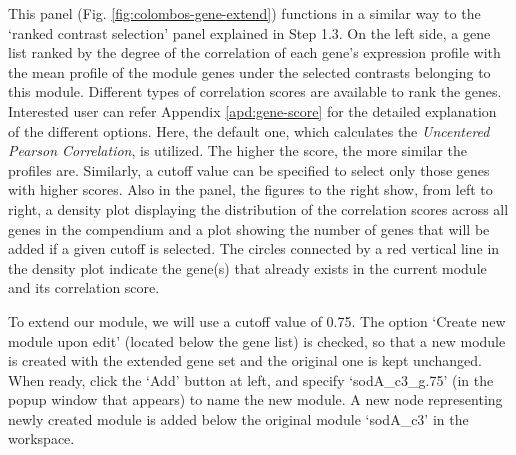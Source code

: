 \begin{small}
This panel (Fig. \ref{fig:colombos-gene-extend}) functions in a similar way to 
the `ranked contrast selection' panel explained in Step 1.3. 
%
On the left side, a gene list ranked by the degree of the correlation of each
gene's expression profile with the mean profile of the module genes under the
selected contrasts belonging to this module.  
%
Different types of correlation scores are available to rank the
genes. Interested user can refer Appendix \ref{apd:gene-score} for the
detailed explanation of the different options.  Here, the default one, which
calculates the \textit{Uncentered Pearson Correlation}, is utilized.  The
higher the score, the more similar the profiles are.  Similarly, a cutoff
value can be specified to select only those genes with higher scores.
%
Also in the panel, the figures to the right
show, from left to right, a density plot displaying the distribution of the
correlation scores across all genes in the compendium and a plot showing the
number of genes that will be added if a given cutoff is selected. The circles
connected by a red vertical line in the density plot indicate the gene(s) that
already exists in the current module and its correlation score.

To extend our module, we will use a cutoff value of 0.75.
%
The option `Create new module upon edit' (located below the gene list) is
checked, so that a new module is created with the extended gene set and the
original one is kept unchanged.
%
When ready, click the `Add' button at left, and specify `sodA\_c3\_g.75' (in
the popup window that appears) to name the new module.  A new node
representing newly created module is added below the original module
`sodA\_c3' in the workspace.

\end{small} %

